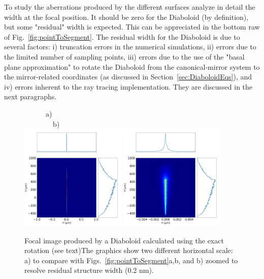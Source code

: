 \documentclass[a4paper, 11pt]{article}
\begin{document}
To study the aberrations produced by the different surfaces analyze in detail the width at the focal position. It should be zero for the Diaboloid (by definition), but some "residual" width is expected. This can be appreciated in the bottom raw of Fig.~\ref{fig:pointToSegment}. The residual width for the Diaboloid is due to several factors: i) truncation errors in the numerical simulations, ii) errors due to the limited number of sampling points, iii) errors due to the use of the "basal plane approximation" to rotate the Diaboloid from the canonical-mirror system to the mirror-related coordinates (as discussed in Section~\ref{sec:DiaboloidEqs}), and iv) errors inherent to the ray tracing implementation. They are discussed in the next paragraphs.

\begin{figure}[h]
\flushleft
~~~~~~a)~~~~~~~~~~~~~~~~~~~~~~~~~~~~~~~~~~~~~~~~~~~~~~~~~~~~~~~~~~~~b)\\
\centering
\includegraphics[width=0.45\textwidth]{figures/p2s_mathematica1.png}
\includegraphics[width=0.45\textwidth]{figures/p2s_matematica2.png}
\caption{\label{fig:mathematica}Focal image produced by a Diaboloid calculated using the exact rotation (see text)The graphics show two different horizontal scale: a) to compare with Figs.~\ref{fig:pointToSegment}a,b, and b) zoomed to resolve residual structure width (0.2 nm).
}
\end{figure}
\end{document}
